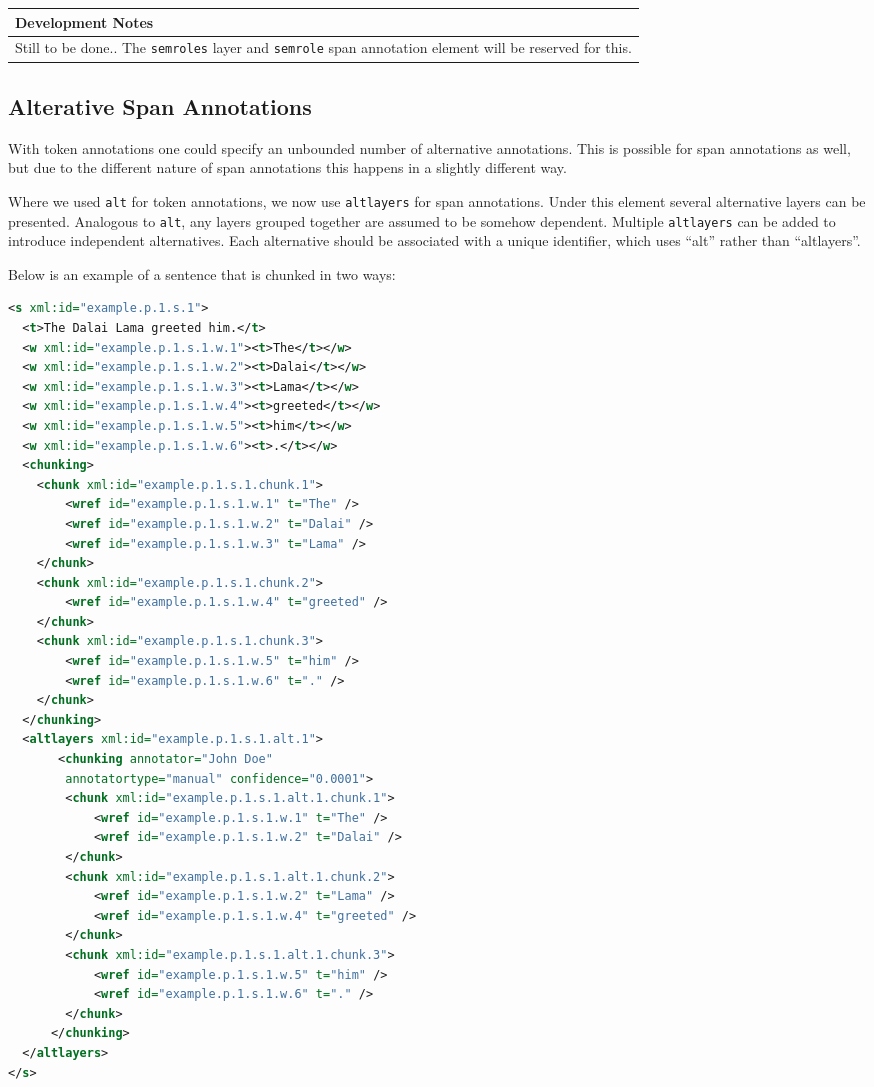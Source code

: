 \documentclass[a4paper,12pt]{report}
\newenvironment{devnotes}
{
\begin{center}
    \begin{tabular}[h!]{|p{0.8\textwidth}|}
    \hline
    {\bf Development Notes}\\\hline}
{   \\\hline
    \end{tabular}
\end{center}}
\begin{document}
\begin{devnotes}
Still to be done.. The \texttt{semroles} layer and \texttt{semrole} span annotation element will be reserved for this.
\end{devnotes}

\subsection{Alterative Span Annotations}

With token annotations one could specify an unbounded number of alternative annotations. This is possible for span annotations as well, but due to the different nature of span annotations this happens in a slightly different way.

Where we used \texttt{alt} for token annotations, we now use \texttt{altlayers} for span annotations. Under this element several alternative layers can be presented. Analogous to \texttt{alt}, any layers grouped together are assumed to be somehow dependent. Multiple \texttt{altlayers} can be added to introduce independent alternatives. Each alternative should be associated with a unique identifier, which uses ``alt'' rather than ``altlayers''. 

Below is an example of a sentence that is chunked in two ways:

\begin{lstlisting}[language=xml]
<s xml:id="example.p.1.s.1">
  <t>The Dalai Lama greeted him.</t>
  <w xml:id="example.p.1.s.1.w.1"><t>The</t></w>
  <w xml:id="example.p.1.s.1.w.2"><t>Dalai</t></w>
  <w xml:id="example.p.1.s.1.w.3"><t>Lama</t></w>
  <w xml:id="example.p.1.s.1.w.4"><t>greeted</t></w>
  <w xml:id="example.p.1.s.1.w.5"><t>him</t></w>
  <w xml:id="example.p.1.s.1.w.6"><t>.</t></w>
  <chunking>
    <chunk xml:id="example.p.1.s.1.chunk.1">       
        <wref id="example.p.1.s.1.w.1" t="The" />       
        <wref id="example.p.1.s.1.w.2" t="Dalai" />       
        <wref id="example.p.1.s.1.w.3" t="Lama" />        
    </chunk>
    <chunk xml:id="example.p.1.s.1.chunk.2">       
        <wref id="example.p.1.s.1.w.4" t="greeted" />
    </chunk>
    <chunk xml:id="example.p.1.s.1.chunk.3">       
        <wref id="example.p.1.s.1.w.5" t="him" />
        <wref id="example.p.1.s.1.w.6" t="." />
    </chunk>    
  </chunking>
  <altlayers xml:id="example.p.1.s.1.alt.1">
       <chunking annotator="John Doe" 
        annotatortype="manual" confidence="0.0001">
        <chunk xml:id="example.p.1.s.1.alt.1.chunk.1">       
            <wref id="example.p.1.s.1.w.1" t="The" />       
            <wref id="example.p.1.s.1.w.2" t="Dalai" />                       
        </chunk>
        <chunk xml:id="example.p.1.s.1.alt.1.chunk.2">       
            <wref id="example.p.1.s.1.w.2" t="Lama" />                       
            <wref id="example.p.1.s.1.w.4" t="greeted" />
        </chunk>
        <chunk xml:id="example.p.1.s.1.alt.1.chunk.3">       
            <wref id="example.p.1.s.1.w.5" t="him" />
            <wref id="example.p.1.s.1.w.6" t="." />
        </chunk>    
      </chunking>   
  </altlayers>
</s>
\end{lstlisting}
\end{document}
